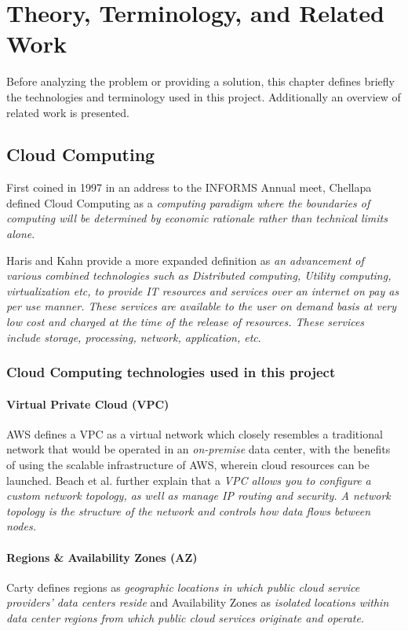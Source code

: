 \part{Theory, Terminology, and Related Work}
\label{sec:theory}

Before analyzing the problem or providing a solution,
this chapter defines briefly the technologies and terminology used in this project.
Additionally an overview of related work is presented.

\chapter{Cloud Computing}
First coined in 1997\cite{ray2018} in an address to the INFORMS Annual meet, 
Chellapa \cite{chellappa1997intermediaries} defined Cloud Computing as a
\emph{computing paradigm where the boundaries of computing will be determined by economic rationale rather than technical limits alone}. 

Haris and Kahn\cite{haris2018systematic} provide a more expanded definition as \emph{an advancement of various combined technologies such as 
Distributed computing, Utility computing, virtualization etc, to provide IT resources and services over an internet on pay as per use manner. 
These services are available to the user on demand basis at very low cost and charged at the time of the release of resources. 
These services include storage, processing, network, application, etc}. 

\section{Cloud Computing technologies used in this project}

\subsection{Virtual Private Cloud (VPC)}
AWS defines a VPC as a virtual network which closely resembles a traditional network that would be operated in an \emph{on-premise} data center, 
with the benefits of using the scalable infrastructure of AWS, wherein cloud resources can be launched.\cite{awsdocs_2022}
Beach et al. further explain that a \emph{VPC allows you to configure a custom network topology, as well as manage IP routing and security. 
A network topology is the structure of the network and controls how data flows between nodes.}\cite{Beach2019}

\subsection{Regions \& Availability Zones (AZ)}
Carty defines regions as \emph{geographic locations in which public cloud service providers' data centers reside} 
and Availability Zones as \emph{isolated locations within data center regions from which public cloud services originate and operate}.\cite{carty_2015}

